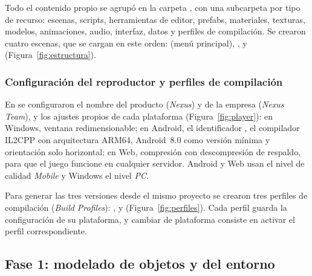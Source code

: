 Todo el contenido propio se agrupó en la carpeta , con una subcarpeta por tipo
de recurso: escenas, scripts, herramientas de editor, prefabs, materiales, texturas, modelos,
animaciones, audio, interfaz, datos y perfiles de compilación. Se crearon cuatro escenas, que se
cargan en este orden:  (menú principal), ,
 y  (Figura~\ref{fig:estructura}).


\subsubsection{Configuración del reproductor y perfiles de compilación}

En  \textrightarrow{}  se configuraron el nombre del producto
(\textit{Nexus}) y de la empresa (\textit{Nexus Team}), y los ajustes propios de cada plataforma
(Figura~\ref{fig:player}): en Windows, ventana redimensionable; en Android, el identificador
, el compilador IL2CPP con arquitectura ARM64, Android~8.0 como versión
mínima y orientación solo horizontal; en Web, compresión con descompresión de respaldo, para que el
juego funcione en cualquier servidor. Android y Web usan el nivel de calidad \textit{Mobile} y
Windows el nivel \textit{PC}.


Para generar las tres versiones desde el mismo proyecto se crearon tres perfiles de compilación
(\textit{Build Profiles}): ,  y 
(Figura~\ref{fig:perfiles}). Cada perfil guarda la configuración de su plataforma, y cambiar de
plataforma consiste en activar el perfil correspondiente.


\subsection{Fase 1: modelado de objetos y del entorno}

